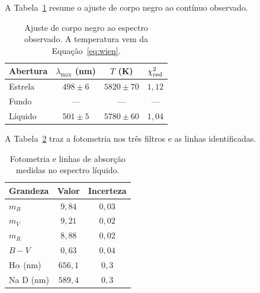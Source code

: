 \documentclass[12pt,a4paper]{article}
\begin{document}

A Tabela~\ref{tab:corpo-negro} resume o ajuste de corpo negro ao contínuo observado.

\begin{table}[H]
\centering
\caption{Ajuste de corpo negro ao espectro observado. A temperatura vem da Equação~\eqref{eq:wien}.}
\label{tab:corpo-negro}
\begin{tabular}{lccc}
\toprule
Abertura & $\lambda_{\max}$ (nm) & $T$ (K) & $\chi^2_{\rm red}$ \\
\midrule
Estrela        & $498 \pm 6$ & $5820 \pm 70$ & $1{,}12$ \\
Fundo          & ---         & ---           & ---      \\
Líquido        & $501 \pm 5$ & $5780 \pm 60$ & $1{,}04$ \\
\bottomrule
\end{tabular}
\end{table}

A Tabela~\ref{tab:fotometria} traz a fotometria nos três filtros e as linhas identificadas.

\begin{table}[H]
\centering
\caption{Fotometria e linhas de absorção medidas no espectro líquido.}
\label{tab:fotometria}
\begin{tabular}{lcc}
\toprule
Grandeza & Valor & Incerteza \\
\midrule
$m_B$              & $9{,}84$  & $0{,}03$ \\
$m_V$              & $9{,}21$  & $0{,}02$ \\
$m_R$              & $8{,}88$  & $0{,}02$ \\
$B-V$              & $0{,}63$  & $0{,}04$ \\
H$\alpha$ (nm)     & $656{,}1$ & $0{,}3$  \\
Na D (nm)          & $589{,}4$ & $0{,}3$  \\
\bottomrule
\end{tabular}
\end{table}
\end{document}
